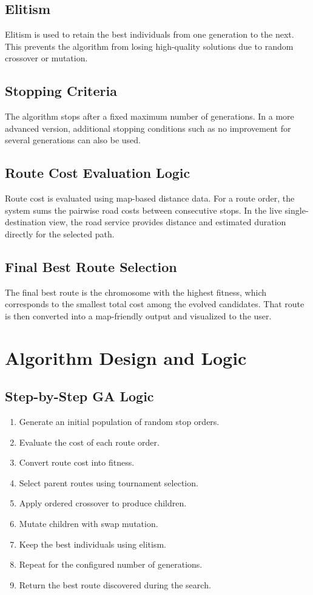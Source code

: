 \subsection{Elitism}
Elitism is used to retain the best individuals from one generation to the next. This prevents the algorithm from losing high-quality solutions due to random crossover or mutation.

\subsection{Stopping Criteria}
The algorithm stops after a fixed maximum number of generations. In a more advanced version, additional stopping conditions such as no improvement for several generations can also be used.

\subsection{Route Cost Evaluation Logic}
Route cost is evaluated using map-based distance data. For a route order, the system sums the pairwise road costs between consecutive stops. In the live single-destination view, the road service provides distance and estimated duration directly for the selected path.

\subsection{Final Best Route Selection}
The final best route is the chromosome with the highest fitness, which corresponds to the smallest total cost among the evolved candidates. That route is then converted into a map-friendly output and visualized to the user.

\section{Algorithm Design and Logic}
\subsection{Step-by-Step GA Logic}
\begin{enumerate}[leftmargin=1.5em]
    \item Generate an initial population of random stop orders.
    \item Evaluate the cost of each route order.
    \item Convert route cost into fitness.
    \item Select parent routes using tournament selection.
    \item Apply ordered crossover to produce children.
    \item Mutate children with swap mutation.
    \item Keep the best individuals using elitism.
    \item Repeat for the configured number of generations.
    \item Return the best route discovered during the search.
\end{enumerate}

